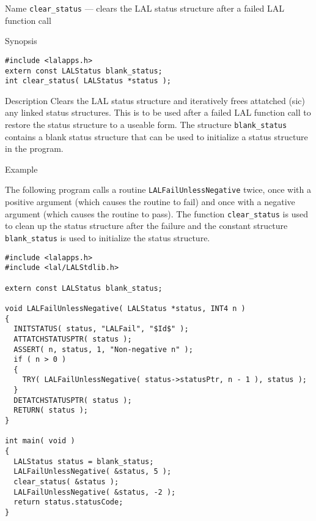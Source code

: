 \documentclass[oneside]{book}
\newenvironment{entry}%
  {\begin{list}{}{\renewcommand{\makelabel}[1]%
    {\parbox[b]{\labelwidth}{\makebox[0pt][l]{\textbf{##1}}\\}}%
    \setlength{\labelwidth}{1em}%
    \setlength{\labelsep}{1em}%
    \setlength{\leftmargin}{2em}%
    \setlength{\topsep}{\medskipamount}%
    \setlength{\itemsep}{\medskipamount}%
    \setlength{\parsep}{\medskipamount}%
    \setlength{\listparindent}{0pt}}}
  {\end{list}}
\newenvironment{indented}%
  {\begin{list}{}{\setlength{\leftmargin}{2em}}%
    \setlength{\itemsep}{\medskipamount}%
    \setlength{\parsep}{\medskipamount}%
    \setlength{\listparindent}{0pt}\item}
  {\end{list}}
\begin{document}
\begin{entry}

\item[Name]
\verb$clear_status$ --- clears the LAL status structure after a failed LAL
function call

\item[Synopsis]
\begin{verbatim}
#include <lalapps.h>
extern const LALStatus blank_status;
int clear_status( LALStatus *status );
\end{verbatim}

\item[Description]
Clears the LAL status structure and iteratively frees attatched (sic) any
linked status structures.  This is to be used after a failed LAL function
call to restore the status structure to a useable form.  The structure
\verb$blank_status$ contains a blank status structure that can be used to
initialize a status structure in the program.

\item[Example]

The following program calls a routine \verb$LALFailUnlessNegative$ twice,
once with a positive argument (which causes the routine to fail) and once
with a negative argument (which causes the routine to pass).  The function
\verb$clear_status$ is used to clean up the status structure after the
failure and the constant structure \verb$blank_status$ is used to initialize
the status structure.

\begin{indented}
\begin{verbatim}
#include <lalapps.h>
#include <lal/LALStdlib.h>

extern const LALStatus blank_status;

void LALFailUnlessNegative( LALStatus *status, INT4 n )
{
  INITSTATUS( status, "LALFail", "$Id$" );
  ATTATCHSTATUSPTR( status );
  ASSERT( n, status, 1, "Non-negative n" );
  if ( n > 0 )
  {
    TRY( LALFailUnlessNegative( status->statusPtr, n - 1 ), status );
  }
  DETATCHSTATUSPTR( status );
  RETURN( status );
}

int main( void )
{
  LALStatus status = blank_status;
  LALFailUnlessNegative( &status, 5 );
  clear_status( &status );
  LALFailUnlessNegative( &status, -2 );
  return status.statusCode;
}
\end{verbatim}
\end{indented}

\end{entry}
\end{document}
